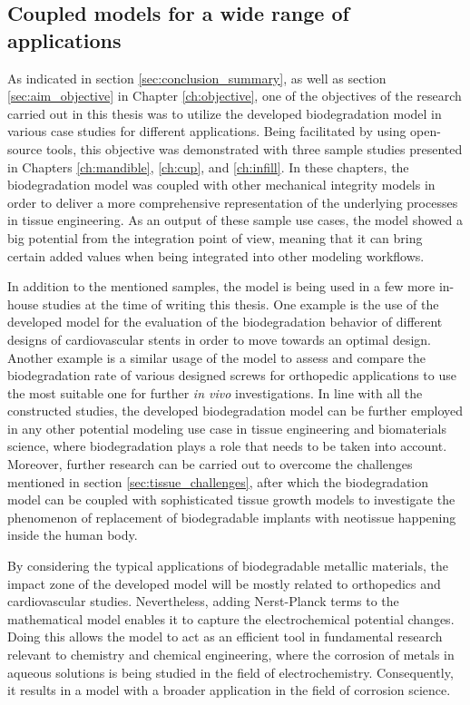 \subsection{Coupled models for a wide range of applications}

As indicated in section \ref{sec:conclusion_summary}, as well as section \ref{sec:aim_objective} in Chapter \ref{ch:objective}, one of the objectives of the research carried out in this thesis was to utilize the developed biodegradation model in various case studies for different applications. Being facilitated by using open-source tools, this objective was demonstrated with three sample studies presented in Chapters \ref{ch:mandible}, \ref{ch:cup}, and \ref{ch:infill}. In these chapters, the biodegradation model was coupled with other mechanical integrity models in order to deliver a more comprehensive representation of the underlying processes in tissue engineering. As an output of these sample use cases, the model showed a big potential from the integration point of view, meaning that it can bring certain added values when being integrated into other modeling workflows.

In addition to the mentioned samples, the model is being used in a few more in-house studies at the time of writing this thesis. One example is the use of the developed model for the evaluation of the biodegradation behavior of different designs of cardiovascular stents in order to move towards an optimal design. Another example is a similar usage of the model to assess and compare the biodegradation rate of various designed screws for orthopedic applications to use the most suitable one for further \textit{in vivo} investigations. In line with all the constructed studies, the developed biodegradation model can be further employed in any other potential modeling use case in tissue engineering and biomaterials science, where biodegradation plays a role that needs to be taken into account. Moreover, further research can be carried out to overcome the challenges mentioned in section \ref{sec:tissue_challenges}, after which the biodegradation model can be coupled with sophisticated tissue growth models to investigate the phenomenon of replacement of biodegradable implants with neotissue happening inside the human body.

By considering the typical applications of biodegradable metallic materials, the impact zone of the developed model will be mostly related to orthopedics and cardiovascular studies. Nevertheless, adding Nerst-Planck terms to the mathematical model enables it to capture the electrochemical potential changes. Doing this allows the model to act as an efficient tool in fundamental research relevant to chemistry and chemical engineering, where the corrosion of metals in aqueous solutions is being studied in the field of electrochemistry. Consequently, it results in a model with a broader application in the field of corrosion science.





\cleardoublepage

